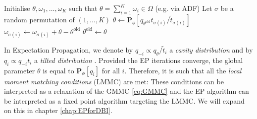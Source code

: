 \begin{algorithm}[!h]\small
	\caption{\label{alg:ep}}
	\begin{algorithmic}[1]
	\State Initialise $\theta,\omega_{1},\dots,\omega_{K}$ such that $\theta=\sum_{i=1}^{K}\omega_{i} \in \Omega$ (e.g. via ADF)
		\State Let $\sigma$ be a random permutation of $(1,\dots,K)$
    		\State $\theta \leftarrow \mathbf P_{\phi}[q_{\theta^{\text{old}}}t_{\sigma(i)}/\tilde t_{\sigma(i)}]$
    		\State $\omega_{\sigma(i)} \leftarrow \omega_{\sigma(i)} + \theta-\theta^{\text{old}}$
			\State $\theta^{\text{old}} \leftarrow \theta$
		\EndFor
	\EndFor\\	
	\Return{$\theta$}
	\end{algorithmic}
\end{algorithm} 

In Expectation Propagation, we denote by $q_{-i}\propto q_{\theta}/\tilde t_{i}$ a \emph{cavity distribution} and by $q_{i}\propto q_{-i}t_{i}$ a \emph{tilted distribution} \citep{seeger07, gelman14}. Provided the EP iterations converge, the global parameter $\theta$ is equal to $\mathbf P_\phi[q_i]$ for all $i$. Therefore, it is such that all the \emph{local moment matching conditions} (LMMC) are met:
%
%
These conditions can be interpreted as a relaxation of the GMMC \eqref{eq:GMMC} and the EP algorithm can be interpreted as a fixed point algorithm targeting the LMMC. We will expand on this in chapter \ref{chap:EPforDBI}.
